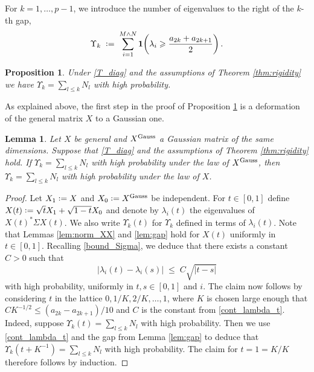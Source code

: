 \documentclass[11pt]{article} %
\numberwithin{equation}{section}
\numberwithin{figure}{section}
\theoremstyle{plain} %
\newtheorem{lemma}[theorem]{Lemma}
\newtheorem{proposition}[theorem]{Proposition}
\theoremstyle{definition} %
\newcommand{\f}[1]{\boldsymbol{\mathrm{#1}}} %
\newcommand{\txt}[1]{\text{\rm{#1}}}
\newcommand*{\deq}{\mathrel{\vcenter{\baselineskip0.65ex \lineskiplimit0pt \hbox{.}\hbox{.}}}=}
\renewcommand{\leq}{\leqslant}
\renewcommand{\geq}{\geqslant}
\newcommand{\indbb}[1]{\f 1 \pbb{#1}}
\newcommand{\pbb}[1]{\biggl({#1}\biggr)}
\newcommand{\abs}[1]{\lvert #1 \rvert}
\begin{document}
For $k = 1, \dots, p-1$, we introduce the number of eigenvalues to the right of the $k$-th gap,
\begin{equation*}
\Upsilon_k \;\deq\; \sum_{i = 1}^{M \wedge N} \indbb{\lambda_i \geq \frac{a_{2k} + a_{2k+1}}{2}}\,.
\end{equation*}
\begin{proposition} \label{prop:counting}
Under \eqref{T_diag} and the assumptions of Theorem \ref{thm:rigidity} we have
$\Upsilon_k = \sum_{l \leq k} N_l$ with high probability.
\end{proposition}
As explained above, the first step in the proof of Proposition \ref{prop:counting} is a deformation of the general matrix $X$ to a Gaussian one.

\begin{lemma} \label{lem:interp_Gauss}
Let $X$ be general and $X^{\txt{Gauss}}$ a Gaussian matrix of the same dimensions.
Suppose that \eqref{T_diag} and the assumptions of Theorem \ref{thm:rigidity} hold. If $\Upsilon_k = \sum_{l \leq k} N_l$ with high probability under the law of $X^{\txt{Gauss}}$, then $\Upsilon_k = \sum_{l \leq k} N_l$ with high probability under the law of $X$.
\end{lemma}

\begin{proof}
Let $X_1 \deq X$ and $X_0 \deq X^{\txt{Gauss}}$ be independent. For $t \in [0,1]$ define $X(t) \deq \sqrt{t} X_1 + \sqrt{1 - t} X_0$ and denote by $\lambda_i(t)$ the eigenvalues of $X(t)^* \Sigma X(t)$. We also write $\Upsilon_k(t)$ for $\Upsilon_k$ defined in terms of $\lambda_i(t)$. Note that Lemmas \ref{lem:norm_XX} and \ref{lem:gap} hold for $X(t)$ uniformly in $t \in [0,1]$. Recalling \eqref{bound_Sigma}, we deduce that there exists a constant $C > 0$ such that
\begin{equation} \label{cont_lambda_t}
\abs{\lambda_i(t) - \lambda_i(s)} \;\leq\; C \sqrt{\abs{t - s}}
\end{equation}
with high probability, uniformly in $t,s \in [0,1]$ and $i$. The claim now follows by considering $t$ in the lattice $0, 1/K, 2/K, \dots, 1$, where $K$ is chosen large enough that $C K^{-1/2} \leq (a_{2k} - a_{2k+1})/10$ and $C$ is the constant from \eqref{cont_lambda_t}. Indeed, suppose $\Upsilon_k(t) = \sum_{l \leq k} N_l$ with high probability. Then we use \eqref{cont_lambda_t} and the gap from Lemma \ref{lem:gap} to deduce that $\Upsilon_k(t + K^{-1}) = \sum_{l \leq k} N_l$ with high probability. The claim for $t = 1 = K/K$ therefore follows by induction.
\end{proof}
\end{document}
